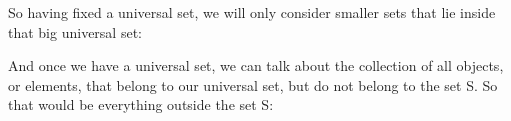 \documentclass[pdftex, brazil, 12pt, twoside]{article}
\begin{document}
\begin{figure}[H]
  \begin{center}
  \end{center}
\end{figure}

So having fixed a universal set, we will only consider
smaller sets that lie inside that big universal set:

\begin{figure}[H]
  \begin{center}
  \end{center}
\end{figure}

And once we have a universal set, we can talk about the
collection of all objects, or elements, that belong to our
universal set, but do not belong to the set S. So that
would be everything outside the set S:

\begin{figure}[H]
  \begin{center}
  \end{center}
\end{figure}
\end{document}
